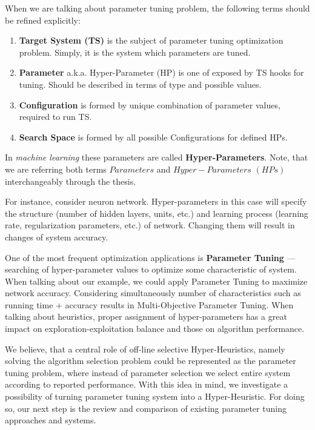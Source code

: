 When we are talking about parameter tuning problem, the following terms should be refined explicitly:
\begin{enumerate}
	\item \textbf{Target System (TS)} is the subject of parameter tuning optimization problem. Simply, it is the system which parameters are tuned.
	\item \textbf{Parameter} a.k.a. Hyper-Parameter (HP) is one of exposed by TS hooks for tuning. Should be described in terms of type and possible values.
	\item \textbf{Configuration} is formed by unique combination of parameter values, required to run TS.
	\item \textbf{Search Space} is formed by all possible Configurations for defined HPs.
\end{enumerate}

In \textit{machine learning} these parameters are called \textbf{Hyper-Parameters}. Note, that we are referring both terms $Parameters$ and $Hyper-Parameters$ $(HPs)$ interchangeably through the thesis.


For instance, consider neuron network. Hyper-parameters in this case will specify the structure (number of hidden layers, units, etc.) and learning process (learning rate, regularization parameters, etc.) of network. Changing them will result in changes of system accuracy.


One of the most frequent optimization applications is \textbf{Parameter Tuning} — searching of hyper-parameter values to optimize some characteristic of system. When talking about our example, we could apply Parameter Tuning to maximize network accuracy. Considering simultaneously number of characteristics such as running time + accuracy results in Multi-Objective Parameter Tuning.
When talking about heuristics, proper assignment of hyper-parameters has a great impact on exploration-exploitation balance and those on algorithm performance.


We believe, that a central role of off-line selective Hyper-Heuristics, namely solving the algorithm selection problem could be represented as the parameter tuning problem, where instead of parameter selection we select entire system according to reported performance. With this idea in mind, we investigate a possibility of turning parameter tuning system into a Hyper-Heuristic.
For doing so, our next step is the review and comparison of existing parameter tuning approaches and systems. 


